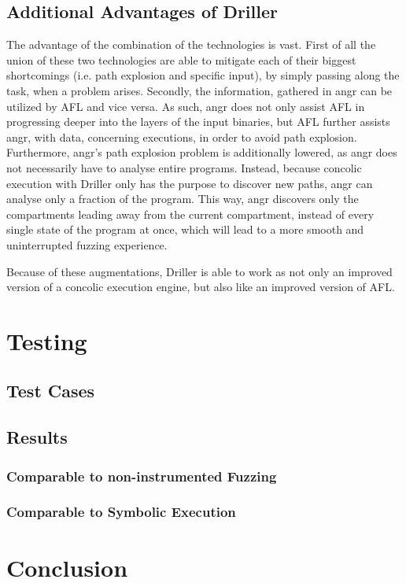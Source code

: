\documentclass[a4paper]{article}
\begin{document}
\subsection{Additional Advantages of Driller}
The advantage of the combination of the technologies is vast. First of all the union of these two technologies are able to mitigate each of their biggest shortcomings (i.e. path explosion and specific input), by simply passing along the task, when a problem arises. Secondly, the information, gathered in angr can be utilized by AFL and vice versa. As such, angr does not only assist AFL in progressing deeper into the layers of the input binaries, but AFL further assists angr, with data, concerning executions, in order to avoid path explosion. Furthermore, angr's path explosion problem is additionally lowered, as angr does not necessarily have to analyse entire programs. Instead, because concolic execution with Driller only has the purpose to discover new paths, angr can analyse only a fraction of the program. This way, angr discovers only the compartments leading away from the current compartment, instead of every single state of the program at once, which will lead to a more smooth and uninterrupted fuzzing experience.

Because of these augmentations, Driller is able to work as not only an improved version of a concolic execution engine, but also like an improved version of AFL.
\section{Testing}
\subsection{Test Cases}
\subsection{Results}
\subsubsection*{Comparable to non-instrumented Fuzzing}
\subsubsection*{Comparable to Symbolic Execution}



\section{Conclusion}
\end{document}

